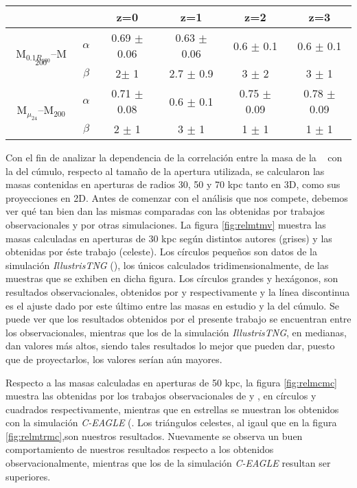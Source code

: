 \begin{table}[H]
\centering
\begin{tabular}{c|c|c c c c}
\hline
& &z=0& z=1& z=2& z=3\\
\hline
 \multirow{2}{*}{M$_{0.1R_{500}}$--M$_{200}$} &$\alpha$ & 0.69 $\pm$ 0.06 & 0.63 $\pm$ 0.06 & 0.6 $\pm$ 0.1  & 0.6 $\pm$ 0.1 \\
                          &$\beta$  & 2$\pm$ 1 & 2.7 $\pm$ 0.9& 3 $\pm$ 2 & 3 $\pm$ 1 \\
\hline
\multirow{2}{*}{M$_{\mu_{24}}$--M$_{200}$} &$\alpha$ & 0.71 $\pm$  0.08 &  0.6 $\pm$ 0.1 & 0.75 $\pm$ 0.09& 0.78 $\pm$ 0.09 \\
                          &$\beta$  & 2 $\pm$ 1 & 3 $\pm$ 1& 1 $\pm$ 1& 1 $\pm$ 1 \\
\hline
\end{tabular}
\caption{ }\label{tab:1}
\end{table}

Con el fin de analizar la dependencia de la correlaci\'on entre la masa
de la \bcg~ con la del c\'umulo, respecto al tama\~no de la apertura utilizada,
se calcularon las masas contenidas en aperturas de radios 30, 50 y 70 kpc tanto
en 3D, como sus proyecciones en 2D. 
Antes de comenzar con el an\'alisis que nos compete, debemos ver qu\'e
tan bien dan las mismas comparadas con
las obtenidas por trabajos observacionales y por otras simulaciones. 
La figura \ref{fig:relmtmv} muestra las masas calculadas en aperturas de
30 kpc seg\'un distintos autores (grises) y las obtenidas por \'este trabajo (celeste).
Los c\'irculos peque\~nos son datos
de la simulaci\'on \textit{IllustrisTNG} (\cite{pil17}), los \'unicos
calculados tridimensionalmente, de las muestras que se exhiben en dicha figura.
Los c\'irculos grandes y hex\'agonos, son resultados observacionales, obtenidos
por \cite{kra14} y \cite{zha16} respectivamente y la l\'inea discontinua
es el ajuste dado por este \'ultimo entre las masas en estudio y la del c\'umulo.
Se puede ver que los resultados obtenidos por el presente trabajo se encuentran entre los observacionales,
mientras que los de la simulaci\'on \textit{IllustrisTNG}, en medianas, dan valores m\'as altos, siendo tales
resultados lo mejor que pueden dar, puesto que de proyectarlos, los valores ser\'ian a\'un mayores.


Respecto a las masas calculadas en aperturas de 50 kpc, la figura \ref{fig:relmcmc} muestra las obtenidas por los
trabajos observacionales de \cite{kra14} y \cite{gon13}, en c\'irculos y cuadrados respectivamente,
mientras que en estrellas se muestran los obtenidos con la simulaci\'on \textit{C-EAGLE} (\cite{bah17}. Los
tri\'angulos celestes, al igaul que en la figura \ref{fig:relmtrmc},son nuestros resultados.
Nuevamente se observa un buen comportamiento de nuestros resultados respecto a los obtenidos
observacionalmente, mientras que los de la simulaci\'on \textit{C-EAGLE} resultan ser superiores.


